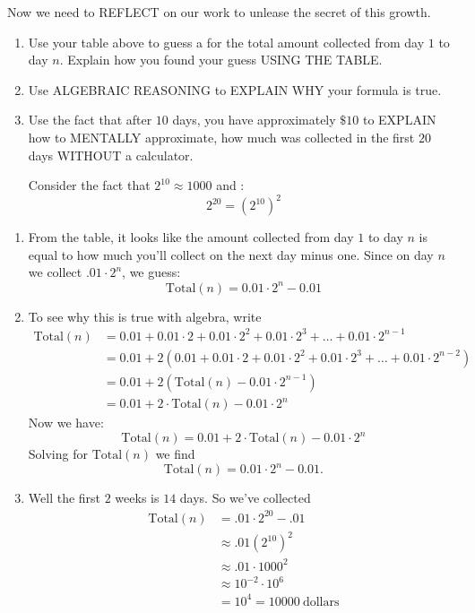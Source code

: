 \documentclass[nooutcomes,noauthor,hints]{ximera}
\begin{document}
\begin{question}
  Now we need to REFLECT on our work to unlease the secret of this growth.
  \begin{enumerate}
    \item Use your table above to guess a for the total amount
      collected from day $1$ to day $n$. Explain how you found your
      guess USING THE TABLE.
    \item Use ALGEBRAIC REASONING to EXPLAIN WHY your formula is true.
    \item Use the fact that after $10$ days, you have approximately
      $\$10$ to EXPLAIN how to MENTALLY approximate, how much was
      collected in the first $20$ days WITHOUT a calculator.
      \begin{hint}
        Consider the fact that $2^10 \approx 1000$ and :
        \[
        2^{20} = \left(2^{10}\right)^2
        \]
      \end{hint}
  \end{enumerate}
  \begin{freeResponse}
    \begin{enumerate}
      \item From the table, it looks like the amount collected from
        day $1$ to day $n$ is equal to how much you'll collect on the
        next day minus one. Since on day $n$ we collect $.01\cdot
        2^n$, we guess:
        \[
        \mathrm{Total}(n) = 0.01\cdot 2^{n} -0.01
        \]
      \item To see why this is true with algebra, write
        \begin{align*}
        \mathrm{Total}(n) &= 0.01 +0.01\cdot 2+0.01\cdot 2^2 +0.01 \cdot 2^3 + \dots + 0.01 \cdot 2^{n-1}\\
        &= 0.01 + 2 ( 0.01 +0.01\cdot 2+0.01\cdot 2^2 +0.01 \cdot 2^3 + \dots + 0.01 \cdot 2^{n-2})\\
        &= 0.01 + 2 ( \mathrm{Total}(n) - 0.01\cdot 2^{n-1})\\
        &= 0.01 + 2\cdot\mathrm{Total}(n) - 0.01\cdot 2^{n}
        \end{align*}
        Now we have:
        \[
        \mathrm{Total}(n)= 0.01 + 2\cdot\mathrm{Total}(n) - 0.01\cdot 2^{n}
        \]
    Solving for $\mathrm{Total}(n)$ we find
    \[
    \mathrm{Total}(n) = 0.01\cdot 2^{n} -0.01.
    \]
  \item Well the first $2$ weeks is $14$ days. So we've collected 
    \begin{align*}
      \mathrm{Total}(n) &= .01\cdot 2^{20} - .01\\
        &\approx .01 \left(2^{10}\right)^2 \\
      &\approx .01 \cdot 1000^2 \\
      &\approx 10^{-2} \cdot 10^6 \\
        &= 10^4 = 10000~\text{dollars} 
    \end{align*}
    \end{enumerate}
  \end{freeResponse}
\end{question}
\end{document}
